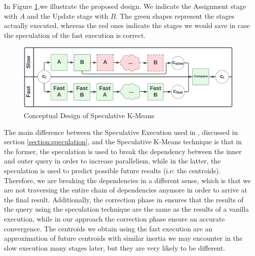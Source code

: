 In Figure \ref{fig:speculation_conceptual_design},we illustrate the proposed design. We indicate the Assignment stage with $A$ and the Update stage with $B$. The green shapes represent the stages actually executed, whereas the red ones indicate the stages we would save in case the speculation of the fast execution is correct. 

\begin{figure}[ht]
\centering
\includegraphics[width=\linewidth]{./plots/speculative_KMeans_conceptual_design.png}
\caption{Conceptual Design of Speculative K-Means}
\label{fig:speculation_conceptual_design}
\end{figure}


The main difference between the Speculative Execution used in \cite{Sioulas:282304}, discussed in section \ref{section:speculation}, and the Speculative K-Means technique is that in the former, the speculation is used to break the dependency between the inner and outer query in order to increase parallelism, while in the latter, the speculation is used to predict possible future results (i.e: the centroids). Therefore, we are breaking the dependencies in a different sense, which is that we are not traversing the entire chain of dependencies anymore in order to arrive at the final result. Additionally, the correction phase in \cite{Sioulas:282304} ensures that the results of the query using the speculation technique are the same as the results of a vanilla execution, while in our approach the correction phase ensure an accurate convergence. The centroids we obtain using the fast execution are an approximation of future centroids with similar inertia we may encounter in the slow execution many stages later, but they are very likely to be different.

